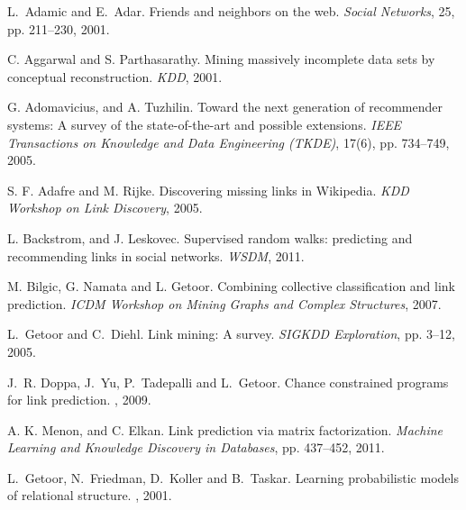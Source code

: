 \documentclass[10pt,journal,compsoc]{IEEEtran}
\begin{document}

%
%
%
\begin{thebibliography}{1}

L.~Adamic and E.~Adar. Friends and neighbors on the web. {\em
Social Networks}, 25, pp. 211--230, 2001.

 C. Aggarwal and S. Parthasarathy. Mining
massively incomplete data sets by conceptual reconstruction. {\em
KDD}, 2001.

 G. Adomavicius, and A. Tuzhilin.
Toward the next generation of recommender systems: A survey of the
state-of-the-art
 and possible extensions. {\em IEEE Transactions on Knowledge and Data Engineering (TKDE)},
 17(6), pp. 734--749, 2005.

S. F. Adafre and M.  Rijke. Discovering missing links in Wikipedia.
{\em KDD Workshop on Link Discovery}, 2005.


 L. Backstrom, and J. Leskovec.
 Supervised random walks: predicting and recommending
 links in social networks. {\em WSDM}, 2011.

M. Bilgic,  G. Namata and L. Getoor.  Combining collective
classification and link prediction. {\em ICDM Workshop on Mining
Graphs and Complex Structures}, 2007.


L.~Getoor and C.~Diehl. Link mining: A survey.
{\em SIGKDD Exploration}, pp. 3--12, 2005.


J.~R. Doppa, J.~Yu, P.~Tadepalli and L.~Getoor.
\newblock  Chance constrained programs for link prediction.
,
2009.

 A. K. Menon, and C. Elkan.
Link prediction via matrix factorization. {\em Machine Learning and
Knowledge Discovery in Databases}, pp. 437--452, 2011.

L.~Getoor, N.~Friedman, D.~Koller and B.~Taskar.
\newblock  Learning probabilistic models of relational
structure.
, 2001.


\end{thebibliography}
\end{document}
